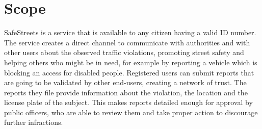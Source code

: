 \section{Scope}
SafeStreets is a service that is available to any citizen having a valid ID number.
The service creates a direct channel to communicate with authorities and with other users about the observed traffic violations, promoting street safety and
helping others who might be in need, for example by reporting a vehicle which is blocking an access for disabled people.
Registered users can submit reports that are going to be validated by other end-users, creating a network of trust.
The reports they file provide information about the violation, the location and the license plate of the subject. This makes reports detailed enough for
approval by public officers, who are able to review them and take proper action to discourage further infractions.
